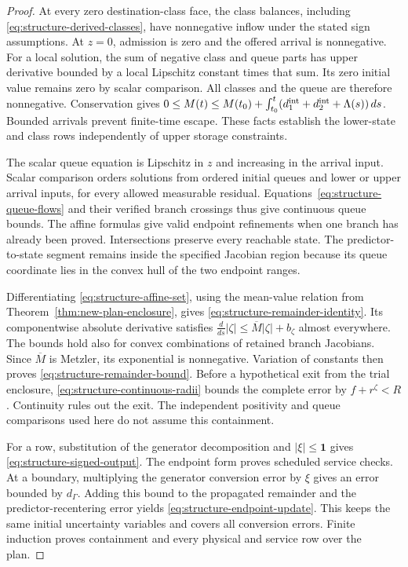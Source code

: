 \documentclass[preprint,12pt]{elsarticle}
\begin{document}
\begin{proof}
At every zero destination-class face, the class balances, including
\eqref{eq:structure-derived-classes}, have nonnegative inflow under the
stated sign assumptions. At $z=0$, admission is zero and the offered arrival
is nonnegative. For a local solution, the sum of negative class and queue
parts has upper derivative bounded by a local Lipschitz constant times
that sum. Its zero initial value remains zero by scalar comparison.
All classes and the queue are therefore nonnegative. Conservation gives
$0\le M(t)\le M(t_0)+\int_{t_0}^t(d^{\rm int}_1+d^{\rm int}_2+\Lambda(s))\,ds$.
Bounded arrivals prevent finite-time escape. These facts establish the
lower-state and class rows independently of upper storage constraints.

The scalar queue equation is Lipschitz in $z$ and increasing in the
arrival input. Scalar comparison orders solutions from ordered initial
queues and lower or upper arrival inputs, for every allowed measurable
residual. Equations~\eqref{eq:structure-queue-flows} and their verified
branch crossings thus give continuous queue bounds. The affine formulas
give valid endpoint refinements when one branch has already been proved.
Intersections preserve every reachable state. The predictor-to-state
segment remains inside the specified Jacobian region because its queue
coordinate lies in the convex hull of the two endpoint ranges.

Differentiating \eqref{eq:structure-affine-set}, using the mean-value
relation from Theorem~\ref{thm:new-plan-enclosure}, gives
\eqref{eq:structure-remainder-identity}. Its componentwise absolute
derivative satisfies $\frac{d}{ds}|\zeta|\le\overline{M}|\zeta|+b_\zeta$
almost everywhere. The bounds hold also for convex combinations of retained
branch Jacobians. Since $\overline{M}$ is Metzler, its exponential is
nonnegative. Variation of constants then proves
\eqref{eq:structure-remainder-bound}. Before a hypothetical exit from the
trial enclosure, \eqref{eq:structure-continuous-radii} bounds the complete
error by $f+r^\zeta<R$. Continuity rules out the exit. The independent
positivity and queue comparisons used here do not assume this containment.

For a row, substitution of the generator decomposition and
$|\xi|\le\mathbf1$ gives \eqref{eq:structure-signed-output}. The endpoint
form proves scheduled service checks. At a boundary, multiplying the generator conversion error by $\xi$
gives an error bounded by $d_\Gamma$. Adding this bound to the propagated
remainder and the predictor-recentering error yields
\eqref{eq:structure-endpoint-update}. This keeps the same initial
uncertainty variables and covers all conversion errors. Finite induction
proves containment and every physical and service row over the plan.
\end{proof}
\end{document}
